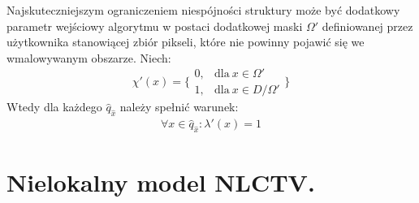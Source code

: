 \documentclass[12pt, twoside, openany]{report}
\theoremstyle{definition}
\begin{document}
Najskuteczniejszym ograniczeniem niespójności struktury może być dodatkowy parametr wejściowy algorytmu w postaci dodatkowej maski $\Omega '$ definiowanej przez użytkownika stanowiącej zbiór pikseli, które nie powinny pojawić się we wmalowywanym obszarze. Niech:
\begin{equation}
\chi' \left(x\right)=\Bigg\{ \begin{array}{ll}
0, & \text{dla} \ x \in \Omega' \\ 
1, & \text{dla} \ x \in D/ \Omega' \end{array}
\Bigg\}
\end{equation}
Wtedy dla każdego $\hat{q}_{\hat{x}}$ należy spełnić warunek:
\begin{align}
\forall x \in \hat{q}_{\hat{x}} : {\lambda }'(x) = 1
\end{align}
\section{Nielokalny model NLCTV.}
\end{document}

